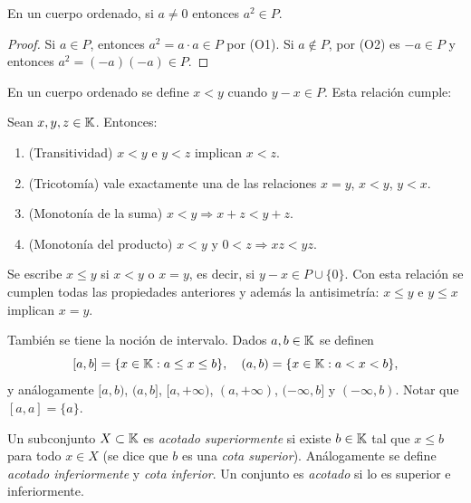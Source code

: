 \begin{prop}
  En un cuerpo ordenado, si \(a \neq 0\) entonces \(a^2 \in P\).
\end{prop}

\begin{proof}
  Si \(a \in P\), entonces \(a^2 = a \cdot a \in P\) por (O1). Si \(a \notin P\), por (O2) es \(-a \in P\) y entonces \(a^2 = (-a)(-a) \in P\).
\end{proof}

En un cuerpo ordenado se define \(x < y\) cuando \(y - x \in P\). Esta relación cumple:

\begin{prop}
  Sean \(x, y, z \in \mathbb{K}\). Entonces:
  \begin{enumerate}[label=(\arabic*)]
    \item (Transitividad) \(x < y\) e \(y < z\) implican \(x < z\).
    \item (Tricotomía) vale exactamente una de las relaciones \(x = y\), \(x < y\), \(y < x\).
    \item (Monotonía de la suma) \(x < y \Rightarrow x + z < y + z\).
    \item (Monotonía del producto) \(x < y\) y \(0 < z \Rightarrow xz < yz\).
  \end{enumerate}
\end{prop}

Se escribe \(x \leq y\) si \(x < y\) o \(x = y\), es decir, si \(y - x \in P \cup \{0\}\). Con esta relación se cumplen todas las propiedades anteriores y además la antisimetría: \(x \leq y\) e \(y \leq x\) implican \(x = y\).

También se tiene la noción de intervalo. Dados \(a, b \in \mathbb{K}\) se definen
\[
  [a, b] = \{ x \in \mathbb{K} : a \leq x \leq b \}, \quad (a, b) = \{ x \in \mathbb{K} : a < x < b \},
\]
y análogamente \([a, b)\), \((a, b]\), \([a, +\infty)\), \((a, +\infty)\), \((-\infty, b]\) y \((-\infty, b)\). Notar que \([a, a] = \{a\}\).

Un subconjunto \(X \subset \mathbb{K}\) es \emph{acotado superiormente} si existe \(b \in \mathbb{K}\) tal que \(x \leq b\) para todo \(x \in X\) (se dice que \(b\) es una \emph{cota superior}). Análogamente se define \emph{acotado inferiormente} y \emph{cota inferior}. Un conjunto es \emph{acotado} si lo es superior e inferiormente.
